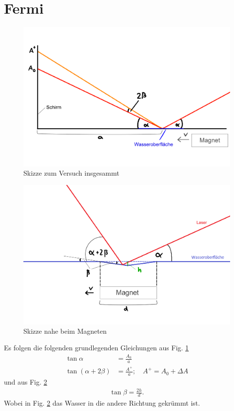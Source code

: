 \documentclass[11pt,a4paper,titlepage, ngerman]{article}
\newcommand{\reffig}[1]{Fig. \ref{fig:#1}}
\begin{document}
	
	\tableofcontents
	\newpage
	
	\section{Fermi}
	\begin{figure}[ht]
		\includegraphics[width=\textwidth]{SkizzeFermi1.png}
		\caption{Skizze zum Versuch insgesammt}
		\label{fig:Fermi1}
	\end{figure}
	\begin{figure}[ht]
		\includegraphics[width=\textwidth]{SkizzeFermi2.png}
		\caption{Skizze nahe beim Magneten}
		\label{fig:Fermi2}
	\end{figure}
	Es folgen die folgenden grundlegenden Gleichungen aus Fig. \ref{fig:Fermi1}
	\begin{align}
		\tan \alpha &= \frac{A_0}{a}
		\label{eq:schirm1}\\
		\tan (\alpha + 2 \beta) &= \frac{A^+}{a};\quad A^+ = A_0+\Delta A
		\label{eq:schirm2}
	\end{align}
	und aus Fig. \ref{fig:Fermi2}
	\begin{align}
		\tan \beta = \frac{2 h}{d}.
		\label{eq:kruemmung}
	\end{align}
	Wobei in \reffig{Fermi2} das Wasser in die andere Richtung gekrümmt ist.
	
\end{document}
